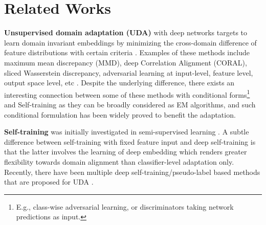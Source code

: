 \documentclass[a4paper,conference]{IEEEtran}
\theoremstyle{plain}%
\begin{document}
 




 












\section{Related Works}




\noindent\textbf{Unsupervised domain adaptation (UDA)} with deep networks \cite{he2020classification,liu2019unimodal,liu2019conservative,liu2018ordinal,liu2018data} targets to learn domain invariant embeddings by minimizing the cross-domain difference of feature distributions with certain criteria \cite{liu2017line,liu2018joint}. Examples of these methods include maximum mean discrepancy (MMD), deep Correlation Alignment (CORAL), sliced Wasserstein discrepancy, adversarial learning at input-level, feature level, output space level, etc \cite{kouw2018introduction,liu2019feature}. Despite the underlying difference, there exists an interesting connection between some of these methods with conditional forms\footnote{E.g., class-wise adversarial learning, or discriminators taking network predictions as input.} and Self-training as they can be broadly considered as EM algorithms, and such conditional formulation has been widely proved to benefit the adaptation.\vspace{+5pt}















\noindent\textbf{Self-training} was initially investigated in semi-supervised learning \cite{triguero2015self}. A subtle difference between self-training with fixed feature input and deep self-training is that the latter involves the learning of deep embedding which renders greater flexibility towards domain alignment than classifier-level adaptation only. Recently, there have been multiple deep self-training/pseudo-label based methods that are proposed for UDA \cite{busto2018open,han2019unsupervised,Zou_2018_ECCV}.
\end{document}
